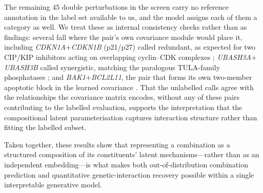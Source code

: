 The remaining 45 double perturbations in the screen carry no reference annotation in the label set
available to us, and the model assigns each of them a category as well. We treat these as internal
consistency checks rather than as findings: several fall where the pair's own covariance module would
place it, including \textit{CDKN1A}$+$\textit{CDKN1B} (p21/p27) called redundant, as expected for two
CIP/KIP inhibitors acting on overlapping cyclin--CDK complexes \cite{sherr1999cdk};
\textit{UBASH3A}$+$\textit{UBASH3B} called synergistic, matching the paralogous
TULA-family phosphatases \cite{tsygankov2013tula}; and \textit{BAK1}$+$\textit{BCL2L11}, the pair that
forms its own two-member apoptotic block in the learned covariance \cite{youle2008bcl2}. That the
unlabelled calls agree with the relationships the covariance matrix encodes, without any of these
pairs contributing to the labelled evaluation, supports the interpretation that the compositional
latent parameterisation captures interaction structure rather than fitting the labelled subset.

Taken together, these results show that representing a combination as a structured composition of its
constituents' latent mechanisms---rather than as an independent embedding---is what makes both
out-of-distribution combination prediction and quantitative genetic-interaction recovery possible
within a single interpretable generative model.